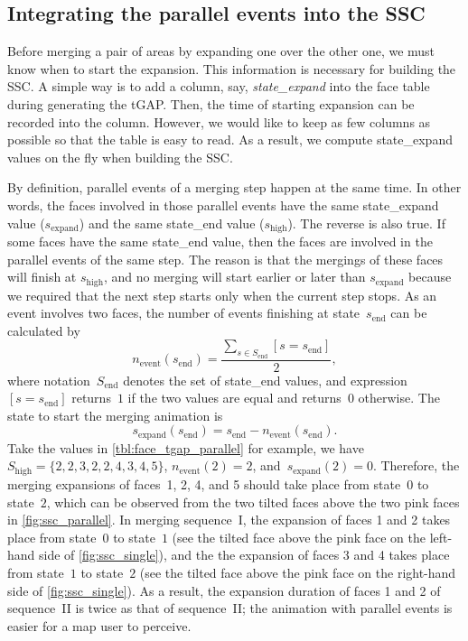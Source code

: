 \documentclass[ijgi,article,submit,moreauthors,pdftex]{Definitions/mdpi}
\begin{document}
\subsection{Integrating the parallel events into the SSC}

Before merging a pair of areas by expanding one over the other one,
we must know when to start the expansion.
This information is necessary for building the SSC.
A simple way is to add a column, say, \emph{state\_expand} 
into the face table during generating the tGAP.
Then, the time of starting expansion can be recorded into the column.
However, we would like to keep as few columns as possible
so that the table is easy to read.
As a result, we compute state\_expand values on the fly 
when building the SSC.

By definition, parallel events of a merging step happen at the same time.
In other words, the faces involved in those parallel events have 
the same state\_expand value ($s_\mathrm{expand}$) and 
the same state\_end value ($s_\mathrm{high}$).
The reverse is also true.
If some faces have the same state\_end value,
then the faces are involved in the parallel events of the same step.
The reason is that the mergings of these faces will finish at $s_\mathrm{high}$,
and no merging will start earlier or later than $s_\mathrm{expand}$
because we required that the next step starts only when the current step stops.
As an event involves two faces,
the number of events finishing at state~$s_\mathrm{end}$ can be calculated by
\begin{equation}
\label{eq:n_event_state}
n_\mathrm{event} (s_\mathrm{end}) = 
\frac{\sum\limits_{s \in S_\mathrm{end}} [s=s_\mathrm{end}]}{2},
\end{equation}
where notation~$S_\mathrm{end}$ denotes the set of state\_end values,
and expression~$[s=s_\mathrm{end}]$ returns~$1$ if the two values are equal 
and returns~$0$ otherwise.
The state to start the merging animation is
\begin{equation}
\label{eq:s_expand_state}
s_\mathrm{expand} (s_\mathrm{end}) = s_\mathrm{end} - n_\mathrm{event} (s_\mathrm{end}).
\end{equation}
Take the values in \tbl\ref{tbl:face_tgap_parallel} for example,
we have~$S_\mathrm{high} = \{2, 2, 3, 2, 2, 4, 3, 4, 5\}$, 
$n_\mathrm{event} (2) = 2$, and~$s_\mathrm{expand} (2) = 0$.
Therefore, the merging expansions of faces~1, 2, 4, and 5 
should take place from state~$0$ to state~$2$,
which can be observed from the two tilted faces above the two pink faces 
in \fig\ref{fig:ssc_parallel}.
In merging sequence~I, the expansion of faces 1 and 2 
takes place from state~$0$ to state~$1$
(see the tilted face above the pink face on the left-hand side of \fig\ref{fig:ssc_single}),
and the the expansion of faces 3 and 4
takes place from state~$1$ to state~$2$
(see the tilted face above the pink face on the right-hand side of \fig\ref{fig:ssc_single}).
As a result, the expansion duration of faces 1 and 2 of sequence~II
is twice as that of sequence~II;
the animation with parallel events is easier for a map user to perceive. 
\end{document}
